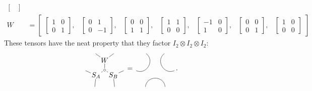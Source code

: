 \begin{align*}
\begin{bmatrix}
\end{bmatrix}
\\
W &= \begin{bmatrix}
\begin{bmatrix}1 & 0\\0 & 1\end{bmatrix}, &
\begin{bmatrix}0 & 1\\0 & -1\end{bmatrix}, &
\begin{bmatrix}0 & 0\\1 & 1\end{bmatrix}, &
\begin{bmatrix}1 & 1\\0 & 0\end{bmatrix}, &
\begin{bmatrix}-1 & 0\\1 & 0\end{bmatrix}, &
\begin{bmatrix}0 & 0\\0 & 1\end{bmatrix}, &
\begin{bmatrix}1 & 0\\0 & 0\end{bmatrix}
\end{bmatrix}
\end{align*}
These tensors have the neat property that they factor $I_2\otimes I_2\otimes I_2$:
\[
\begin{tikzpicture}[inner sep=1pt, baseline=.0em]
    \node (m) at (0,0) {$\sbullet$};
    \node (W) at (0,.5) {$W$};
    \node (SB) at (-30:.5) {$S_B$};
    \node (SA) at (-150:.5) {$S_A$};
    \node (w1) at (60:1) {};
    \node (w2) at (120:1) {};
    \node (sa1) at (-120:1) {};
    \node (sa2) at (-180:1) {};
    \node (sb1) at (-0:1) {};
    \node (sb2) at (-60:1) {};
    \draw (m) -- (W);
    \draw (m) -- (SA);
    \draw (m) -- (SB);
    \draw (W) -- (w1) {};
    \draw (W) -- (w2) {};
    \draw (SB) -- (sb1) {};
    \draw (SB) -- (sb2) {};
    \draw (SA) -- (sa1) {};
    \draw (SA) -- (sa2) {};
\end{tikzpicture}
=
\begin{tikzpicture}[inner sep=1pt, baseline=.0em]
    \node (m) at (0,0) {};
    \node (W) at (0,.5) {};
    \node (SB) at (-30:.5) {};
    \node (SA) at (-150:.5) {};
    \node (w1) at (60:1) {};
    \node (w2) at (120:1) {};
    \node (sa1) at (-120:1) {};
    \node (sa2) at (-180:1) {};
    \node (sb1) at (-0:1) {};
    \node (sb2) at (-60:1) {};
    \draw (sa2) .. controls (SA) and (W) .. (w2);
    \draw (sa1) .. controls (SA) and (SB) .. (sb2);
    \draw (sb1) .. controls (SB) and (W) .. (w1);
\end{tikzpicture}
.
\]
